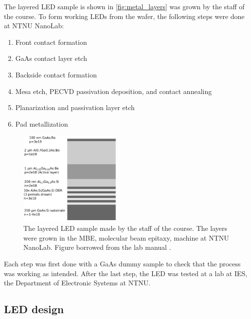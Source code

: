 
The layered LED sample is shown in \autoref{fig:metal_layers} was grown by the staff of the course.
To form working LEDs from the wafer, the following steps were done at NTNU NanoLab:

\begin{enumerate}
    \item Front contact formation
    \item GaAs contact layer etch
    \item Backside contact formation
    \item Mesa etch, PECVD passivation deposition, and contact annealing
    \item Planarization and passivation layer etch
    \item Pad metallization
\end{enumerate}

\begin{figure}[ht]
    \centering
    \includegraphics[width=0.45\textwidth]{figures/metal_layers.jpg}
    \caption{
        The layered LED sample made by the staff of the course.
        The layers were grown in the MBE, molecular beam epitaxy, machine at NTNU NanoLab.
        Figure borrowed from the lab manual \cite{labmanual}.
    }
    \label{fig:metal_layers}

\end{figure}

Each step was first done with a GaAs dummy sample to check that the process was working as intended.
After the last step, the LED was tested at a lab at IES, the Department of Electronic Systems at NTNU.


\subsection{LED design}
\label{methods:led_design}


